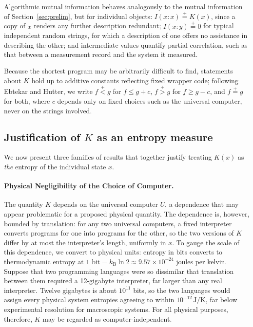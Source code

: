 \documentclass[10pt]{article}
\theoremstyle{definition}
\theoremstyle{remark}
\newcommand{\plt}{\mathrel{\stackrel{+}{<}}}
\newcommand{\pgt}{\mathrel{\stackrel{+}{>}}}
\newcommand{\peq}{\mathrel{\stackrel{+}{=}}}
\newcommand{\kB}{k_{\mathrm{B}}}
\begin{document}
Algorithmic mutual information behaves analogously to the mutual information of Section~\ref{sec:prelim}, but for individual objects: $I(x : x) \peq K(x)$, since a copy of $x$ renders any further description redundant; $I(x : y) \peq 0$ for typical independent random strings, for which a description of one offers no assistance in describing the other; and intermediate values quantify partial correlation, such as that between a measurement record and the system it measured.

Because the shortest program may be arbitrarily difficult to find, statements about $K$ hold up to additive constants reflecting fixed wrapper code; following Ebtekar and Hutter, we write $f \plt g$ for $f \le g + c$, $f \pgt g$ for $f \ge g - c$, and $f \peq g$ for both, where $c$ depends only on fixed choices such as the universal computer, never on the strings involved.

\subsection{Justification of $K$ as an entropy measure}
\label{sec:Kjustified}

We now present three families of results that together justify treating $K(x)$ as \emph{the} entropy of the individual state $x$.

\paragraph{Physical Negligibility of the Choice of Computer.} The quantity $K$ depends on the universal computer $U$, a dependence that may appear problematic for a proposed physical quantity. The dependence is, however, bounded by translation: for any two universal computers, a fixed interpreter converts programs for one into programs for the other, so the two versions of $K$ differ by at most the interpreter's length, uniformly in $x$. To gauge the scale of this dependence, we convert to physical units: entropy in bits converts to thermodynamic entropy at $1 \text{ bit} = \kB \ln 2 \approx 9.57 \times 10^{-24}$ joules per kelvin. Suppose that two programming languages were so dissimilar that translation between them required a 12-gigabyte interpreter, far larger than any real interpreter. Twelve gigabytes is about $10^{11}$ bits, so the two languages would assign every physical system entropies agreeing to within $10^{-12}\,\mathrm{J/K}$, far below experimental resolution for macroscopic systems. For all physical purposes, therefore, $K$ may be regarded as computer-independent.
\end{document}
